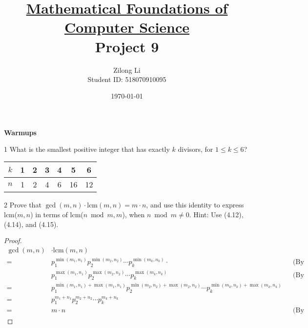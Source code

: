 \documentclass[a4paper,12pt]{article}
\title{\small \underline{Mathematical Foundations of Computer Science}\\\Large Project 9}
\author{Zilong Li\\\small Student ID: 518070910095}
\date{\today}
\makeatletter
\newtheorem*{solution}{Solution}
\theoremstyle{definition}
\renewenvironment{solution}[1][Solution] {\par\pushQED{\qed}\normalfont\topsep6\p@\@plus6\p@\relax\trivlist\item[\hskip\labelsep\bfseries#1\@addpunct{.}]\ignorespaces}{\popQED\endtrivlist\@endpefalse} \makeatother
\newenvironment{problems}{\begin{list}{}{\renewcommand{\makelabel}[1]{\textbf{##1}\hfil}}}{\end{list}}
\makeatother
\begin{document}
\maketitle

\noindent\textbf{Warmups}

\begin{problems}
    \item[1] What  is  the  smallest  positive  integer  that  has  exactly $k$ divisors,  for $1\leq k\leq 6$?
    \begin{solution}
        \begin{tabular}{c|cccccc}
            $k$ & 1 & 2 & 3 & 4 & 5 & 6 \\
            \hline
            $n$ & 1 & 2 & 4 & 6 & 16 & 12 
        \end{tabular}
    \end{solution} 
    \item[2] Prove that $\gcd (m, n)\cdot\text{lcm} (m, n)=m\cdot n$, and use this identity to express lcm($m, n$) in terms of lcm($n\bmod m, m$), when $n \bmod m\neq 0$. Hint: Use (4.12), (4.14), and (4.15).
    \begin{proof}
        \begin{align*}
            \gcd (m,n) &\cdot \text{lcm}(m,n) \\
            =& p_1^{\min(m_1,n_1)}p_2^{\min(m_2,n_2)}\cdots p_k^{\min(m_k,n_k)}\cdot&& \text{(By (4.14))}\\
            &p_1^{\max(m_1,n_1)}p_2^{\max(m_2,n_2)}\cdots p_k^{\max(m_k,n_k)} && \text{(By (4.15))}\\
            =&p_1^{\min(m_1,n_1)+\max(m_1,n_1)}p_2^{\min(m_2,n_2)+\max(m_2,n_2)}\cdots p_k^{\min(m_k,n_k)+\max(m_k,n_k)}\\
            =&p_1^{m_1+n_1}p_2^{m_2+n_2}\cdots p_k^{m_k+n_k}\\
            =&m\cdot n &&\text{(By (4.12))}
        \end{align*}


\end{proof}
\end{problems}
\end{document}
